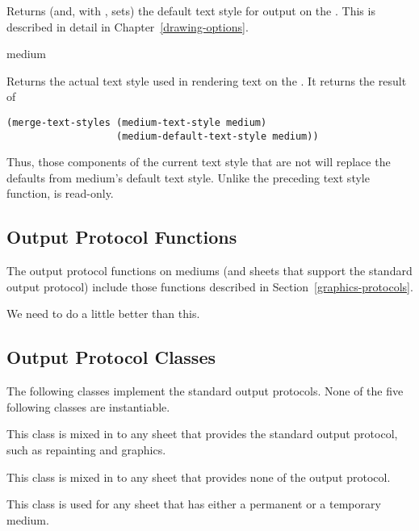 Returns (and, with , sets) the default text style for output on the
 .  This is described in detail in
Chapter~\ref{drawing-options}.


 {medium}

Returns the actual text style used in rendering text on the 
.  It returns the result of

\begin{verbatim} 
(merge-text-styles (medium-text-style medium)
                   (medium-default-text-style medium))
\end{verbatim}

Thus, those components of the current text style that are not  will
replace the defaults from medium's default text style.  Unlike the preceding
text style function,  is read-only.


\subsection {Output Protocol Functions} 

The output protocol functions on mediums (and sheets that support the
standard output protocol) include those functions described in
Section~\ref{graphics-protocols}.

 {We need to do a little better than this.}


\subsection {Output Protocol Classes}

The following classes implement the standard output protocols.  None of the five
following classes are instantiable.


This class is mixed in to any sheet that provides the standard output protocol,
such as repainting and graphics.


This class is mixed in to any sheet that provides none of the output protocol.


This class is used for any sheet that has either a permanent or a temporary
medium.


